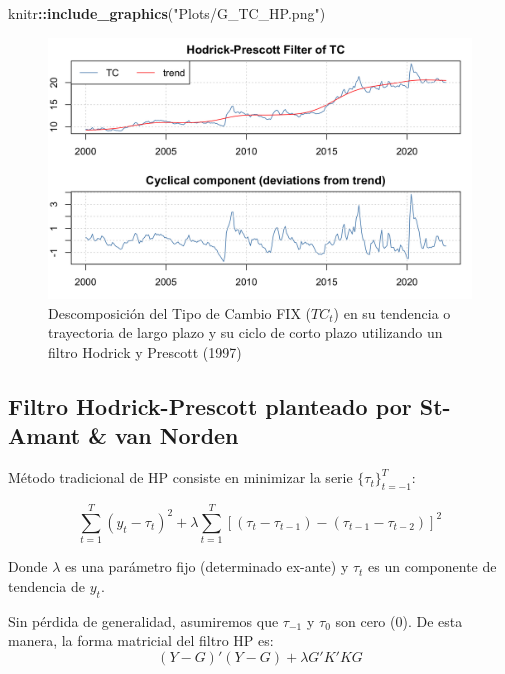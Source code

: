 \documentclass[
]{book}
\newenvironment{Shaded}{\begin{snugshade}}{\end{snugshade}}
\newcommand{\FunctionTok}[1]{\textcolor[rgb]{0.13,0.29,0.53}{\textbf{#1}}}
\newcommand{\NormalTok}[1]{#1}
\newcommand{\SpecialCharTok}[1]{\textcolor[rgb]{0.81,0.36,0.00}{\textbf{#1}}}
\newcommand{\StringTok}[1]{\textcolor[rgb]{0.31,0.60,0.02}{#1}}
\begin{document}
\begin{Shaded}
\begin{Highlighting}[]
\NormalTok{knitr}\SpecialCharTok{::}\FunctionTok{include\_graphics}\NormalTok{(}\StringTok{"Plots/G\_TC\_HP.png"}\NormalTok{) }
\end{Highlighting}
\end{Shaded}

\begin{figure}

{\centering \includegraphics[width=0.95\linewidth]{Plots/G_TC_HP} 

}

\caption{Descomposición del Tipo de Cambio FIX ($TC_t$) en su tendencia o trayectoria de largo plazo y su ciclo de corto plazo utilizando un filtro Hodrick y Prescott (1997)}\label{fig:fig53}
\end{figure}

\hypertarget{filtro-hodrick-prescott-planteado-por-st-amant-van-norden}{%
\subsection{Filtro Hodrick-Prescott planteado por St-Amant \& van Norden}\label{filtro-hodrick-prescott-planteado-por-st-amant-van-norden}}

Método tradicional de HP consiste en minimizar la serie \(\{ \tau_t \}_{t=-1}^T\):

\[\sum_{t=1}^T (y_t - \tau_t)^2 + \lambda \sum_{t=1}^{T} [(\tau_{t} - \tau_{t-1}) - (\tau_{t-1} - \tau_{t-2})]^2\]

Donde \(\lambda\) es una parámetro fijo (determinado ex-ante) y \(\tau_t\) es un componente de tendencia de \(y_t\).

Sin pérdida de generalidad, asumiremos que \(\tau_{-1}\) y \(\tau_{0}\) son cero (0). De esta manera, la forma matricial del filtro HP es:
\[(Y - G)'(Y - G) + \lambda G' K' K G\]
\end{document}
